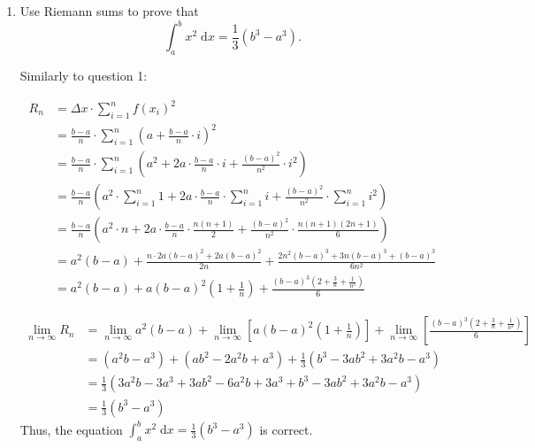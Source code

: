 \documentclass[12pt]{article}
\begin{document}
\begin{enumerate}
    \newpage
    
    \item Use Riemann sums to prove that $$\int_{a}^b x^2 \; \mathrm{d}x = \frac{1}{3}(b^{3}-a^{3}).$$ \par
    Similarly to question 1: \par
    \begin{align*}
    R_n &=\Delta x\cdot\sum_{i=1}^{n}f\left(x_i\right)^2\\
    &=\frac{b-a}{n}\cdot\sum_{i=1}^{n}\left(a +\frac{b-a}{n}\cdot i \right)^2\\
    &=\frac{b-a}{n}\cdot\sum_{i=1}^{n}\left(a^2+ 2a\cdot \frac{b-a}{n} \cdot i +\frac{\left( b-a\right)^2}{n^2}\cdot i^2 \right)\\
    &=\frac{b-a}{n}\left(a^2\cdot \sum_{i=1}^{n}1+ 2a\cdot \frac{b-a}{n}\cdot \sum_{i=1}^{n}i +\frac{\left( b-a\right)^2}{n^2}\cdot \sum_{i=1}^{n}i^2 \right)\\
    &=\frac{b-a}{n}\left(a^2\cdot n+ 2a\cdot \frac{b-a}{n}\cdot \frac{n\left( n+1\right)}{2} +\frac{\left( b-a\right)^2}{n^2}\cdot \frac{n\left( n+1\right) \left( 2n+1\right)}{6} \right)\\
    &=a^2\left( b-a\right)
    + \frac{n\cdot2a\left( b-a\right)^2+2a\left(b-a \right)^2}{2n}
    + \frac{2n^2\left(b-a\right)^3+ 3n\left(b-a\right)^3+ \left(b-a\right)^3}{6n^2}\\
    &=a^2\left( b-a\right)
    + a\left(b-a\right)^2\left(1+ \frac{1}{n}\right)
    + \frac{\left(b-a\right)^3 \left(2+\frac{3}{n}+ \frac{1}{n^3} \right)}{6}
\end{align*}


\begin{align*}
    \lim_{n\to\infty}R_n 
    &=\lim_{n\to\infty} a^2\left( b-a\right)
    + \lim_{n\to\infty}\left[ a\left(b-a\right)^2 \left(1+ \frac{1}{n} \right)\right]
    + \lim_{n\to\infty}\left[ \frac{\left(b-a\right)^3 \left(2+\frac{3}{n}+ \frac{1}{n^3} \right)}{6} \right]\\
    &=\left(a^2b-a^3\right)
    + \left(ab^2-2a^2b+a^3\right)
    + \frac{1}{3}\left(b^3-3ab^2+3a^2b-a^3\right)\\
    &= \frac{1}{3} \left(3a^2b-3a^3+ 3ab^2-6a^2b+3a^3+ b^3-3ab^2+3a^2b-a^3 \right)\\
    &= \frac{1}{3}\left(b^3-a^3\right)
\end{align*}
    Thus, the equation $\int_{a}^b x^2 \; \mathrm{d}x= \frac{1}{3} \left(b^3-a^3 \right)$ is correct.\paragraph{}
    

\end{enumerate}
\end{document}
